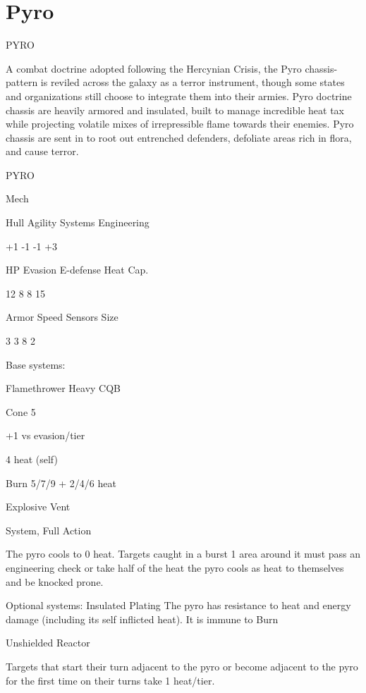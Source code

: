 \section{Pyro}

                                                   PYRO  

A combat doctrine adopted following the Hercynian Crisis, the Pyro chassis-pattern is reviled  
across the galaxy as a terror instrument, though some states and organizations still choose to  
integrate them into their armies. Pyro doctrine chassis are heavily armored and insulated, built to  
manage incredible heat tax while projecting volatile mixes of irrepressible flame towards their  
enemies. Pyro chassis are sent in to root out entrenched defenders, defoliate areas rich in flora,  
and cause terror. 
 

 PYRO 

 Mech 

 Hull       Agility      Systems       Engineering 

 +1         -1           -1            +3 

 HP         Evasion      E-defense     Heat Cap. 

 12         8            8             15 

 Armor      Speed        Sensors       Size 

 3          3            8             2 

Base systems:
 
Flamethrower  
Heavy CQB
 
Cone 5
 
+1 vs evasion/tier
 
4 heat (self)
 
Burn 5/7/9 + 2/4/6 heat
 

Explosive Vent
 
System, Full Action
 
The pyro cools to 0 heat. Targets caught in a burst 1 area around it must pass an engineering  
check or take half of the heat the pyro cools as heat to themselves and be knocked prone.
 

Optional systems:  
Insulated Plating  
The pyro has resistance to heat and energy damage (including its self inflicted heat). It is immune  
to Burn
 

Unshielded Reactor  

                                                                                                           


Targets that start their turn adjacent to the pyro or become adjacent to the pyro for the first time  
on their turns take 1 heat/tier.
 

